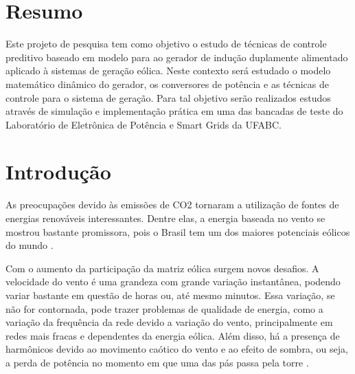 	
	\begingroup
		\chapter{Resumo}
		\label{capitulo:resumo}
	\endgroup
	\setcounter{page}{1}

	Este projeto de pesquisa tem como objetivo o estudo de técnicas de controle preditivo baseado em modelo para ao gerador de indução duplamente alimentado aplicado à sistemas de geração eólica. Neste contexto será estudado o modelo matemático dinâmico do gerador, os conversores de potência e as técnicas de controle para o sistema de geração. Para tal objetivo serão realizados estudos através de simulação e implementação prática em uma das bancadas de teste do Laboratório de Eletrônica de Potência e Smart Grids da UFABC.  
	
	\begingroup
	\let\clearpage\relax
	\chapter{Introdução}
	\label{capitulo:introducao}
	\endgroup
	
	As preocupações devido às emissões de CO2 tornaram a utilização de fontes de energias renováveis interessantes. Dentre elas, a energia baseada no vento se mostrou bastante promissora, pois o Brasil tem um dos maiores potenciais eólicos do mundo \cite{atlaseolico}.
	
	Com o aumento da participação da matriz eólica surgem novos desafios. A velocidade do vento é uma grandeza com grande variação instantânea, podendo variar bastante em questão de horas ou, até mesmo minutos. Essa variação, se não for contornada, pode trazer problemas de qualidade de energia, como a variação da frequência da rede devido a variação do vento, principalmente em redes mais fracas e dependentes da energia eólica. Além disso, há a presença de harmônicos devido ao movimento caótico do vento e ao efeito de sombra, ou seja, a perda de potência no momento em que uma das pás passa pela torre \cite{pintofundamentos}.
	
